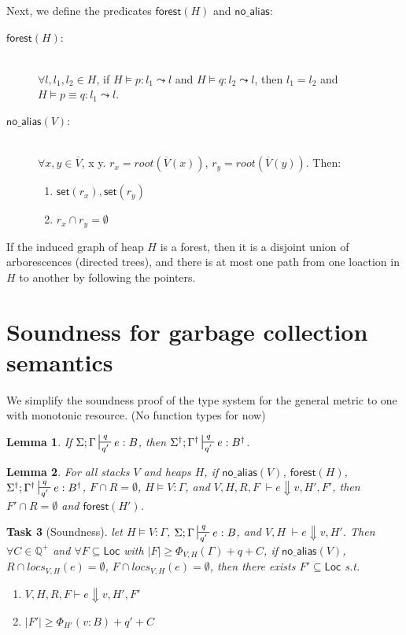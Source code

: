\documentclass[11pt]{article}
\newcounter{group}
\newtheorem{theorem}{Task}[group]
\newcommand{\ms}[1]{\ensuremath{\mathsf{#1}}}
\newcommand{\na}[1]{\mathsf{no\_alias}(#1)}
\newtheorem{lemma}[theorem]{Lemma}
\begin{document}
Next, we define the predicates $\ms{forest}(H)$ and $\ms{no\_alias}$: 
\begin{description}
\item [$\ms{forest}(H)$: ]\\
$\forall l,l_1,l_2 \in H$, if $H \vDash p : l_1 \leadsto l$ and $H \vDash q : l_2 \leadsto l$, then $l_1 = l_2$ and $H \vDash p \equiv q : l_1 \leadsto l$.
\item[$\na{V}$: ] \\
$\forall x,y \in \overline V$, x \ne y.  $r_x = root(\overline V(x))$, $r_y = root(\overline V(y))$. Then:
\begin{enumerate}[(1)]
\item $\ms{set}(r_x), \ms{set}(r_y)$
\item $r_x \cap r_y = \emptyset$
\end{enumerate}
\end{description}
If the induced graph of heap $H$ is a forest, then it is a disjoint union of arborescences (directed trees), and there is at most one path from one loaction in $H$ to another by following the pointers.
\section{Soundness for garbage collection semantics}

We simplify the soundness proof of the type system for the general metric to one with monotonic resource.
(No function types for now)

\begin{lemma}
\label{a} If $\Sigma; \Gamma \sststile{q'}{q} e : B$, then $\Sigma^{\dagger}; \Gamma^{\dagger} \sststile{q'}{q} e : B^{\dagger}$.
\end{lemma}
\begin{lemma}
For all stacks $V$ and heaps $H$, if $\na{V}$, $\ms{forest}(H)$, $\Sigma^{\dagger}; \Gamma^{\dagger} \sststile{q'}{q} e : B^{\dagger}$, $F \cap R = \emptyset$, $H \vDash V : \Gamma$, and $V,H,R,F \; \vdash e \Downarrow v, H', F'$, then $F' \cap R = \emptyset$ and $\ms{forest}(H')$.
\end{lemma}
\begin{theorem}[Soundness]
\label{a} let $H \vDash V : \Gamma$, $\Sigma; \Gamma \sststile{q'}{q} e : B$,
and $V,H \; \vdash e \Downarrow v, H'$. Then $\forall C \in \mathbb{Q}^{+}$ and $\forall F \subseteq \ms{Loc}$ with $|F| \ge \Phi_{V,H}(\Gamma) + q + C$,  if $\na{V}$, $R \cap locs_{V,H}(e) = \emptyset$,  $F \cap locs_{V,H}(e) = \emptyset$, then there exists $F' \subseteq \ms{Loc}$ s.t.
\begin{enumerate}
  \item $V,H,R,F \vdash e \Downarrow v, H', F'$
  \item $|F'| \ge \Phi_{H'}(v:B) + q' + C$
\end{enumerate}
\end{theorem}
\end{document}
